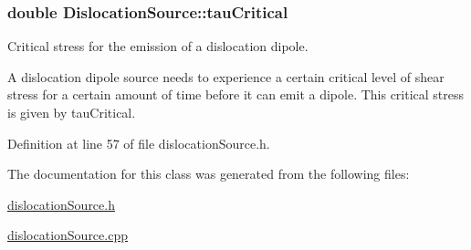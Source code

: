 \hypertarget{classDislocationSource_ad91294a3ab5b6f6156a2ad67b9df954e}{
\subsubsection[{tau\-Critical}]{\setlength{\rightskip}{0pt plus 5cm}double {\bf \-Dislocation\-Source\-::tau\-Critical}}}\label{de/de3/classDislocationSource_ad91294a3ab5b6f6156a2ad67b9df954e}


\-Critical stress for the emission of a dislocation dipole. 

\-A dislocation dipole source needs to experience a certain critical level of shear stress for a certain amount of time before it can emit a dipole. \-This critical stress is given by tau\-Critical. 

\-Definition at line 57 of file dislocation\-Source.\-h.



\-The documentation for this class was generated from the following files\-:\begin{DoxyCompactItemize}
\item 
\hyperlink{dislocationSource_8h}{dislocation\-Source.\-h}\item 
\hyperlink{dislocationSource_8cpp}{dislocation\-Source.\-cpp}\end{DoxyCompactItemize}
